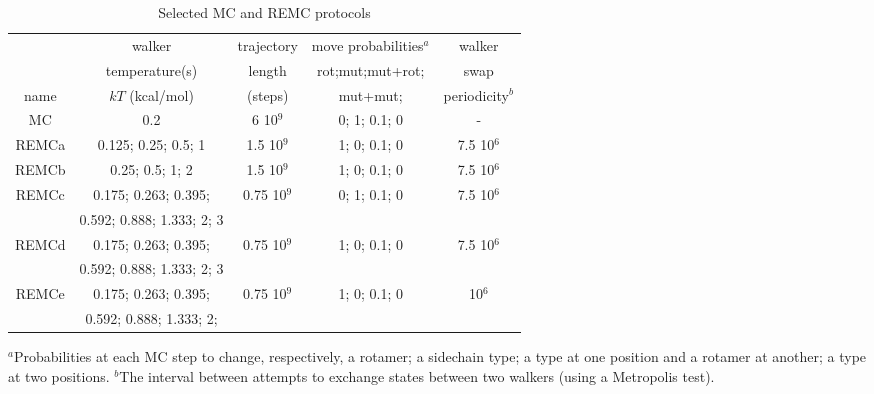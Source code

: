 \documentclass[a4paper,12pt]{article}
\begin{document}
\begin{table}[H]                            
\caption{Selected MC and REMC protocols}
\label{tab:parameters}                      
\begin{center} \small 
\renewcommand{\arraystretch}{0.75}
\begin{tabular}{ccccc} \hline \hline  
      &  walker                   & trajectory & move probabilities$^a$ & walker     \\ 
      &  temperature(s)           & length     & rot;mut;mut+rot; & swap       \\ 
name  & $kT$ (kcal/mol)           & (steps)    & mut+mut;         & periodicity$^b$ \smallskip \\  \hline 
MC    & 0.2                       &   6 10$^9$ & 0; 1; 0.1; 0     &  -          \smallskip \\      
REMCa & 0.125; 0.25; 0.5; 1       & 1.5 10$^9$ & 1; 0; 0.1; 0     & 7.5 10$^6$  \smallskip \\   
REMCb & 0.25; 0.5; 1; 2           & 1.5 10$^9$ & 1; 0; 0.1; 0     & 7.5 10$^6$  \smallskip \\ 
REMCc & 0.175; 0.263; 0.395;      & 0.75 10$^9$& 0; 1; 0.1; 0     & 7.5 10$^6$  \\
      & 0.592; 0.888; 1.333; 2; 3 &  &  &  \smallskip \\
REMCd & 0.175; 0.263; 0.395;      &0.75 10$^9$ & 1; 0; 0.1; 0     & 7.5 10$^6$  \\
      & 0.592; 0.888; 1.333; 2; 3 &  &  &  \smallskip \\
REMCe & 0.175; 0.263; 0.395;      &0.75 10$^9$ & 1; 0; 0.1; 0     &     10$^6$  \\ 
      & 0.592; 0.888; 1.333; 2;   &  &  &  \smallskip \\ \hline
\end{tabular}
\end{center}
{\small \noindent $^a$Probabilities at each MC step to change, respectively, a
rotamer; a sidechain type; a type at one position and a rotamer at another;
a type at two positions. $^b$The interval between attempts to exchange states
between two walkers (using a Metropolis test).
}
\end{table}
\end{document}
